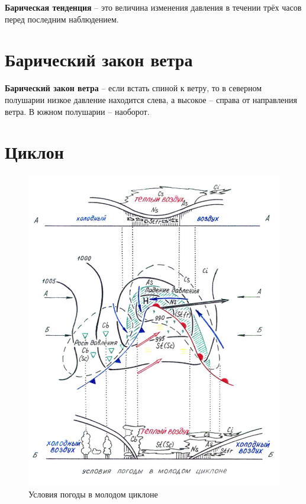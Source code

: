 \documentclass[a4paper, 12pt, twoside, final, book, russian, fittopage, cyremdash, openright]{ncc}
\begin{document}
\textbf{Барическая тенденция} \--- это
величина изменения давления в течении трёх часов перед последним
наблюдением.

\section{Барический закон ветра}
\label{sec:baric_wind_law}

\textbf{Барический закон ветра} \---
если встать спиной к ветру, то в северном полушарии низкое давление
находится слева, а высокое \--- справа от направления ветра. В южном
полушарии \--- наоборот.

\section{Циклон}
\label{sec:cyclon}

\begin{figure}[htb]
   \centering
   \includegraphics[scale=1.0]{03_cyclon.pdf}
   \caption{Условия погоды в молодом циклоне}
   \label{fig:03_cyclon}
\end{figure}
\end{document}
